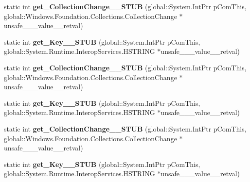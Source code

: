 \begin{DoxyCompactItemize}
static int {\bfseries get\+\_\+\+Collection\+Change\+\_\+\+\_\+\+S\+T\+UB} (global\+::\+System.\+Int\+Ptr p\+Com\+This, global\+::\+Windows.\+Foundation.\+Collections.\+Collection\+Change $\ast$unsafe\+\_\+\+\_\+\+\_\+value\+\_\+\+\_\+retval)
\item 
\mbox{\label{struct_windows_1_1_foundation_1_1_collections_1_1_i_map_changed_event_args___a__string___v_______impl_1_1_vtbl_a81ce24d6887200b2c88559dd613b1d94}} 
static int {\bfseries get\+\_\+\+Key\+\_\+\+\_\+\+S\+T\+UB} (global\+::\+System.\+Int\+Ptr p\+Com\+This, global\+::\+System.\+Runtime.\+Interop\+Services.\+H\+S\+T\+R\+I\+NG $\ast$unsafe\+\_\+\+\_\+\+\_\+value\+\_\+\+\_\+retval)
\item 
\mbox{\label{struct_windows_1_1_foundation_1_1_collections_1_1_i_map_changed_event_args___a__string___v_______impl_1_1_vtbl_a9c8b411e0f3cc163f8ffe5b81bb3e3f0}} 
static int {\bfseries get\+\_\+\+Collection\+Change\+\_\+\+\_\+\+S\+T\+UB} (global\+::\+System.\+Int\+Ptr p\+Com\+This, global\+::\+Windows.\+Foundation.\+Collections.\+Collection\+Change $\ast$unsafe\+\_\+\+\_\+\+\_\+value\+\_\+\+\_\+retval)
\item 
\mbox{\label{struct_windows_1_1_foundation_1_1_collections_1_1_i_map_changed_event_args___a__string___v_______impl_1_1_vtbl_a81ce24d6887200b2c88559dd613b1d94}} 
static int {\bfseries get\+\_\+\+Key\+\_\+\+\_\+\+S\+T\+UB} (global\+::\+System.\+Int\+Ptr p\+Com\+This, global\+::\+System.\+Runtime.\+Interop\+Services.\+H\+S\+T\+R\+I\+NG $\ast$unsafe\+\_\+\+\_\+\+\_\+value\+\_\+\+\_\+retval)
\item 
\mbox{\label{struct_windows_1_1_foundation_1_1_collections_1_1_i_map_changed_event_args___a__string___v_______impl_1_1_vtbl_a9c8b411e0f3cc163f8ffe5b81bb3e3f0}} 
static int {\bfseries get\+\_\+\+Collection\+Change\+\_\+\+\_\+\+S\+T\+UB} (global\+::\+System.\+Int\+Ptr p\+Com\+This, global\+::\+Windows.\+Foundation.\+Collections.\+Collection\+Change $\ast$unsafe\+\_\+\+\_\+\+\_\+value\+\_\+\+\_\+retval)
\item 
\mbox{\label{struct_windows_1_1_foundation_1_1_collections_1_1_i_map_changed_event_args___a__string___v_______impl_1_1_vtbl_a81ce24d6887200b2c88559dd613b1d94}} 
static int {\bfseries get\+\_\+\+Key\+\_\+\+\_\+\+S\+T\+UB} (global\+::\+System.\+Int\+Ptr p\+Com\+This, global\+::\+System.\+Runtime.\+Interop\+Services.\+H\+S\+T\+R\+I\+NG $\ast$unsafe\+\_\+\+\_\+\+\_\+value\+\_\+\+\_\+retval)
\end{DoxyCompactItemize}
